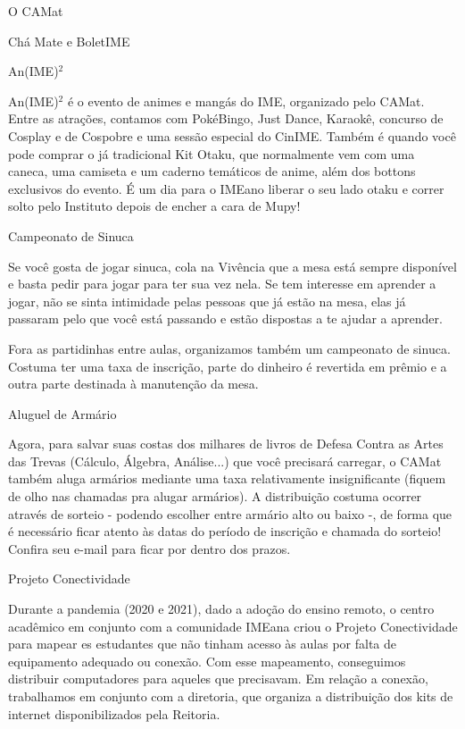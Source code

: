 \begin{secao}{O CAMat}
\begin{subsecao}{Chá Mate e BoletIME}
\end{subsecao}


\begin{subsecao}{An(IME)\texorpdfstring{$^2$}{²}}

An(IME)$^2$ é o evento de animes e mangás do IME, organizado pelo CAMat. Entre as atrações,
contamos com PokéBingo, Just Dance, Karaokê, concurso de Cosplay e de Cospobre e uma sessão 
especial do CinIME.
Também é quando você pode comprar o já tradicional Kit Otaku, que normalmente vem com uma
caneca, uma camiseta e um caderno temáticos de anime, além dos bottons exclusivos do evento.
É um dia para o IMEano liberar o seu lado otaku e correr solto pelo Instituto depois de
encher a cara de Mupy!

\end{subsecao}

\begin{subsecao}{Campeonato de Sinuca}

Se você gosta de jogar sinuca, cola na Vivência que a mesa está sempre disponível
e basta pedir para jogar para ter sua vez nela. Se tem interesse em aprender a jogar,
não se sinta intimidade pelas pessoas que já estão na mesa, elas já passaram pelo
que você está passando e estão dispostas a te ajudar a aprender.

Fora as partidinhas entre aulas, organizamos também um campeonato de sinuca. Costuma
ter uma taxa de inscrição, parte do dinheiro é revertida em prêmio e a outra parte
destinada à manutenção da mesa.

\end{subsecao}


\begin{subsecao}{Aluguel de Armário}

Agora, para salvar suas costas dos milhares de livros de Defesa Contra as Artes
das Trevas (Cálculo, Álgebra, Análise...) que você precisará carregar, o CAMat
também aluga armários mediante uma taxa relativamente insignificante (fiquem de olho
nas chamadas pra alugar armários). A distribuição costuma ocorrer através de sorteio -
podendo escolher entre armário alto ou baixo -, de forma que é necessário ficar atento
às datas do período de inscrição e chamada do sorteio! Confira seu e-mail para ficar por 
dentro dos prazos.

\end{subsecao}

\begin{subsecao}{Projeto Conectividade}

Durante a pandemia (2020 e 2021), dado a adoção do ensino remoto, o centro acadêmico em conjunto 
com a comunidade IMEana criou o Projeto Conectividade para mapear es estudantes que não tinham acesso
às aulas por falta de equipamento adequado ou conexão. Com esse mapeamento, conseguimos distribuir 
computadores para aqueles que precisavam. Em relação a conexão, trabalhamos em conjunto com a diretoria, 
que organiza a distribuição dos kits de internet disponibilizados pela Reitoria.


\end{subsecao}
\end{secao}
